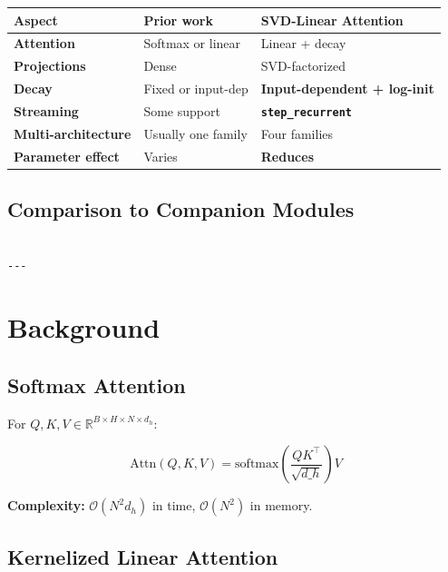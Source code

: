 \begin{table}[H]
\centering
\small
\begin{tabular}{lll}
\toprule
\textbf{Aspect} & \textbf{Prior work} & \textbf{SVD-Linear Attention} \\
\midrule
\textbf{Attention} & Softmax or linear & Linear + decay \\
\textbf{Projections} & Dense & SVD-factorized \\
\textbf{Decay} & Fixed or input-dep & \textbf{Input-dependent + log-init} \\
\textbf{Streaming} & Some support & \textbf{\texttt{step\_recurrent}} \\
\textbf{Multi-architecture} & Usually one family & Four families \\
\textbf{Parameter effect} & Varies & \textbf{Reduces} \\
\bottomrule
\end{tabular}
\end{table}

\subsection{Comparison to Companion Modules}

\begin{lstlisting}

---
\end{lstlisting}


\section{Background}

\subsection{Softmax Attention}

For $Q, K, V \in \mathbb{R}^{B \times H \times N \times d_h}$:

\[
\text{Attn}(Q, K, V) = \text{softmax}\!\left(\frac{Q K^\top}{\sqrt{d\_h}}\right) V
\tag{3.1}
\]

\textbf{Complexity:} $\mathcal{O}(N^2 d_h)$ in time, $\mathcal{O}(N^2)$ in memory.

\subsection{Kernelized Linear Attention}

